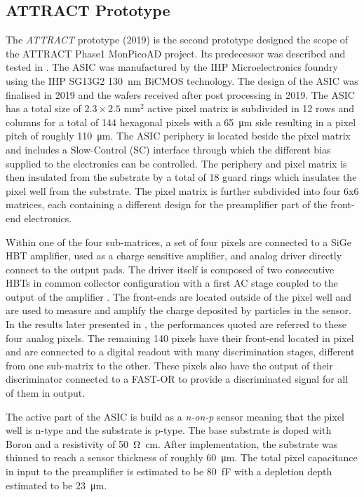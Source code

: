 		\subsection{ATTRACT Prototype}
		The \textit{ATTRACT} prototype (2019) is the second prototype designed the scope of the ATTRACT Phase1 MonPicoAD project. Its predecessor was described and tested in \cite{ATTRACT_proto1, ATTRACT_proto1_50ps}. The ASIC was manufactured by the IHP Microelectronics foundry using the IHP SG13G2 \SI{130}{\nano\meter} BiCMOS technology. The design of the ASIC was finalised in 2019 and the wafers received after post processing in 2019. The ASIC has a total size of $2.3 \times 2.5$ mm$^2$ active pixel matrix is subdivided in 12 rows and columns for a total of 144 hexagonal pixels with a \SI{65}{\micro\meter} side resulting in a pixel pitch of roughly \SI{110}{\micro\meter}. The ASIC periphery is located beside the pixel matrix and includes a Slow-Control (SC) interface through which the different bias supplied to the electronics can be controlled. The periphery and pixel matrix is then insulated from the substrate by a total of 18 guard rings which insulates the pixel well from the substrate. The pixel matrix is further subdivided into four 6x6 matrices, each containing a different design for the preamplifier part of the front-end electronics.  
			
		Within one of the four sub-matrices, a set of four pixels are connected to a SiGe HBT amplifier, used as a charge sensitive amplifier, and analog driver directly connect to the output pads. The driver itself is composed of two consecutive HBTs in common collector configuration with a first AC stage coupled to the output of the amplifier \cite{ATTRACT_proto1_testbeam}. The front-ends are located outside of the pixel well and are used to measure and amplify the charge deposited by particles in the sensor. In the results later presented in , the performances quoted are referred to these four analog pixels. The remaining 140 pixels have their front-end located in pixel and are connected to a digital readout with many discrimination stages, different from one sub-matrix to the other. These pixels also have the output of their discriminator connected to a FAST-OR to provide a discriminated signal for all of them in output. 
		
		The active part of the ASIC is build as a \textit{n-on-p} sensor meaning that the pixel well is n-type and the substrate is p-type. The base substrate is doped with Boron and a resistivity of \SI{50}{\ohm \centi\meter}. After implementation, the substrate was thinned to reach a sensor thickness of roughly \SI{60}{\micro\meter}. The total pixel capacitance in input to the preamplifier is estimated to be \SI{80}{\femto\farad} with a depletion depth estimated to be \SI{23}{\micro\meter}. 
		
